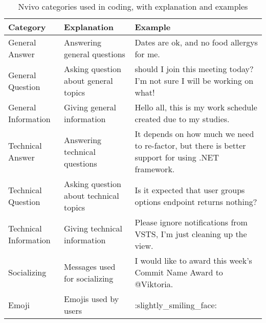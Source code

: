 \begin{sidewaystable}[htb]
\caption{Nvivo categories used in coding, with explanation and examples}
\label{tab:nvivo}
\bigskip
\centering\small\setlength\tabcolsep{2pt}
\hspace*{-1cm}\begin{tabular}{lll}
\toprule
\textbf{Category} & \textbf{Explanation} & \textbf{Example}\\
\midrule
General Answer & Answering general questions & Dates are ok, and no food allergys for me.\\
General Question & Asking question about general topics &  should I join this meeting today? I'm not sure I will be working on what!\\
General Information & Giving general information & Hello all, this is my work schedule created due to my studies.\\
Technical Answer & Answering technical questions & It depends on how much we need to re-factor, but there is better support for using .NET framework.\\ 
Technical Question & Asking question about technical topics & Is it expected that user groups options endpoint returns nothing?\\ 
Technical Information & Giving technical information & Please ignore notifications from VSTS, I'm just cleaning up the view.\\ 
Socializing & Messages used for socializing & I would like to award this week’s Commit Name Award to @Viktoria.\\
Emoji & Emojis used by users & :slightly\_smiling\_face: \\
\bottomrule
\end{tabular}\hspace*{-1cm}
\end{sidewaystable}




